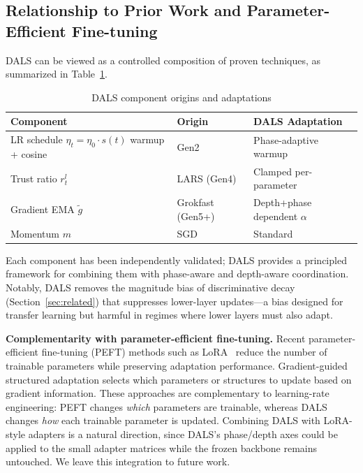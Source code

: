 \documentclass[a4paper,fleqn]{cas-dc}
\begin{document}
\subsection{Relationship to Prior Work and Parameter-Efficient Fine-tuning}\label{sec:related_peft}

DALS can be viewed as a controlled composition of proven techniques, as summarized in Table~\ref{tab:dals_components}.

\begin{table}[h]
\centering
\footnotesize
\renewcommand{\arraystretch}{1.5}
\renewcommand{\tabularxcolumn}[1]{>{\centering\arraybackslash}m{#1}}
\caption{DALS component origins and adaptations}\label{tab:dals_components}
\begin{tabularx}{\columnwidth}{@{} >{\centering\arraybackslash}X m{1.5cm} m{2.2cm} @{}}
\toprule
Component & Origin & DALS Adaptation \\
\midrule
LR schedule \newline $\eta_t = \eta_0 \cdot s(t)$ \newline warmup + cosine & Gen2 & Phase-adaptive \newline warmup \\
\addlinespace[2pt]
Trust ratio $r_t^l$ & LARS (Gen4) & Clamped \newline per-parameter \\
\addlinespace[2pt]
Gradient EMA $\tilde{g}$ & Grokfast (Gen5+) & Depth+phase \newline dependent $\alpha$ \\
\addlinespace[2pt]
Momentum $m$ & SGD & Standard \\
\bottomrule
\end{tabularx}
\end{table}

Each component has been independently validated; DALS provides a principled framework for combining them with phase-aware and depth-aware coordination. Notably, DALS removes the magnitude bias of discriminative decay (Section~\ref{sec:related}) that suppresses lower-layer updates---a bias designed for transfer learning but harmful in regimes where lower layers must also adapt.

\textbf{Complementarity with parameter-efficient fine-tuning.} Recent parameter-efficient fine-tuning (PEFT) methods such as LoRA~\citet{liu2024dora} reduce the number of trainable parameters while preserving adaptation performance. Gradient-guided structured adaptation selects which parameters or structures to update based on gradient information. These approaches are complementary to learning-rate engineering: PEFT changes \emph{which} parameters are trainable, whereas DALS changes \emph{how} each trainable parameter is updated. Combining DALS with LoRA-style adapters is a natural direction, since DALS's phase/depth axes could be applied to the small adapter matrices while the frozen backbone remains untouched. We leave this integration to future work.
\end{document}
